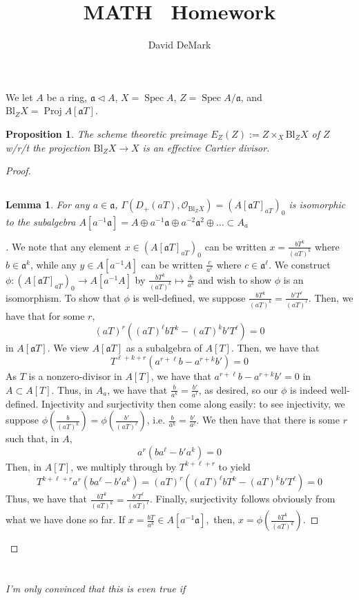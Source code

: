 \documentclass[english,letter,doublesided]{article}
\title{MATH \course~Homework \Roman{hwn}}
\author{David DeMark}
\date{\due}
\DeclareMathOperator{\spec}{Spec}
\newcommand{\OO}{\mathcal{O}}
\newcommand{\afr}{\mathfrak{a}}
\newenvironment{subproof}[1][\proofname]{%
	\renewcommand{\qedsymbol}{$\blacksquare$}%
	\begin{proof}[#1]%
	}{%
	\end{proof}%
}
\newcommand{\prob}[1]{\setcounter{section}{#1-1}\section{}}
\newcommand{\prt}[1]{\setcounter{subsection}{#1-1}\subsection{}}
\newtheorem{lemma}[thm]{Lemma}
\newtheorem*{prop*}{Proposition}
\theoremstyle{remark}
\theoremstyle{definition}
\DeclareMathOperator{\proj}{Proj}
\newcommand{\blo}[2]{\mathrm{Bl}_{#1}{#2}}
\newcommand{\blzx}{\blo{Z}{X}}
\begin{document}
\maketitle
	\prob{1}We let $A$ be a ring, $\afr \triangleleft A$, $X=\spec A$, $Z=\spec A/\afr$, and $\blzx=\proj A[\afr T]$.
	\begin{prop*}
		The scheme theoretic preimage $E_Z(Z):=Z\times_X \blzx$ of $Z$ w/r/t the projection $\blzx\to X$ is an effective Cartier divisor.
	\end{prop*}\begin{proof}\prt{1}
\begin{lemma}
	For any $a\in \afr$, $\Gamma(D_+(aT), \OO_{\blzx})=(A[\afr T]_{aT})_0$ is isomorphic to the subalgebra $A[a^{-1}\afr]=A\oplus a^{-1}\afr\oplus a^{-2}\afr^2\oplus \dots\subset A_a$
\end{lemma}
\begin{subproof}
We note that any element $x\in(A[\afr T]_{aT})_0$ can be written $x=\frac{bT^k}{(aT)^k}$ where $b\in\afr^k$, while any $y\in A[a^{-1}A]$ can be written $\frac{c}{a^\ell}$ where $c\in \afr^\ell$. We construct $\phi:(A[\afr T]_{aT})_0\to A[a^{-1}A]$ by $\frac{bT^k}{(aT)^k}\mapsto \frac{b}{a^k}$ and wish to show $\phi$ is an isomorphism. To show that $\phi$ is well-defined, we suppose $\frac{bT^k}{(aT)^k}=\frac{b'T^{\ell}}{(aT)^\ell}$. Then, we have that for some $r$, $$(aT)^r\left((aT)^\ell bT^k-(aT)^kb'T^\ell\right)=0$$ in $A[\afr T]$. We view $A[\afr T]$ as a subalgebra of $A[T]$. Then, we have that $$T^{\ell+k+r}\left(a^{r+\ell} b-a^{r+k}b'\right)=0$$
As $T$ is a nonzero-divisor in $A[T]$, we have that $a^{r+\ell} b-a^{r+k}b'=0$ in $A\subset A[T]$. Thus, in $A_a$, we have that $\frac{b}{a^k}=\frac{b'}{a^\ell}$, as desired, so our $\phi$ is indeed well-defined. Injectivity and surjectivity then come along easily: to see injectivity, we suppose $\phi(\frac{b}{(aT)^k})=\phi(\frac{b'}{(aT)^\ell})$, i.e. $\frac{b}{a^k}=\frac{b'}{a^\ell}$. We then have that there is some $r$ such that, in $A$, 
$$a^r(ba^{\ell}-b'a^k)=0$$ Then, in $A[T]$, we multiply through by $T^{k+\ell+r}$ to yield
$$T^{k+\ell+r}a^r(ba^{\ell}-b'a^k)=(aT)^r\left((aT)^\ell bT^k-(aT)^kb'T^\ell\right)=0$$
Thus, we have that $\frac{bT^k}{(aT)^k}=\frac{b'T^{\ell}}{(aT)^\ell}$. Finally, surjectivity follows obviously from what we have done so far. If $x=\frac{bT}{a^k}\in A[a^{-1}\afr],$ then, $x=\phi(\frac{bT^k}{(aT)^k})$.
\end{subproof}
\end{proof}
	\prob{4}\emph{I'm only convinced that this is even true if }
\end{document}
